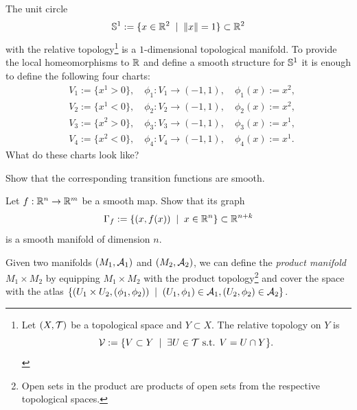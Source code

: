 \begin{example}\label{ex:S1emb}
  The unit circle
  \begin{equation}
    \mathbb{S}^1 := \{x\in\mathbb{R}^2 \;\mid\; \|x\|=1\}\subset\mathbb{R}^2
  \end{equation}
  with the relative topology\footnote{Let $(X,\mathcal{T})$ be a topological space and $Y\subset X$. The relative topology on $Y$ is \begin{equation}\mathcal{V}:=\{V\subset Y\;\mid\;\exists U\in\mathcal{T} \mbox{ s.t. } V = U \cap Y\}.\end{equation}} is a $1$-dimensional topological manifold.
  To provide the local homeomorphisms to $\mathbb{R}$ and define a smooth structure for $\mathbb{S}^1$ it is enough to define the following four charts:
  \begin{equation}
    \begin{aligned}
      &V_1 := \{ x^1 > 0 \},\quad \phi_1: V_1 \to (-1, 1), \quad \phi_1(x) := x^2,\\
      &V_2 := \{ x^1 < 0 \},\quad \phi_2: V_2 \to (-1, 1), \quad \phi_2(x) := x^2,\\
      &V_3 := \{ x^2 > 0 \},\quad \phi_3: V_3 \to (-1, 1), \quad \phi_3(x) := x^1,\\
      &V_4 := \{ x^2 < 0 \},\quad \phi_4: V_4 \to (-1, 1), \quad \phi_4(x) := x^1.
    \end{aligned}
  \end{equation}
  What do these charts look like?
  \begin{exercise}
    Show that the corresponding transition functions are smooth.
  \end{exercise}
\end{example}

\begin{exercise}
  Let $f: \mathbb{R}^n \to \mathbb{R}^m$ be a smooth map.
  Show that its graph
  \begin{equation}
    \Gamma_f := \{(x, f(x)) \;\mid\; x\in\mathbb{R}^n\} \subset\mathbb{R}^{n+k}
  \end{equation}
  is a smooth manifold of dimension $n$.
\end{exercise}

\begin{example}\label{ex:pm}
Given two manifolds $(M_1, \mathcal{A}_1)$ and $(M_2, \mathcal{A}_2)$, we can define the \emph{product manifold} $M_1 \times M_2$ by equipping $M_1 \times M_2$ with the product topology\footnote{Open sets in the product are products of open sets from the respective topological spaces.} and cover the space with the atlas $\{ (U_1\times U_2, (\phi_1, \phi_2)) \;\mid\; (U_1, \phi_1)\in\mathcal{A}_1, (U_2, \phi_2)\in \mathcal{A}_2\}$.
\end{example}

